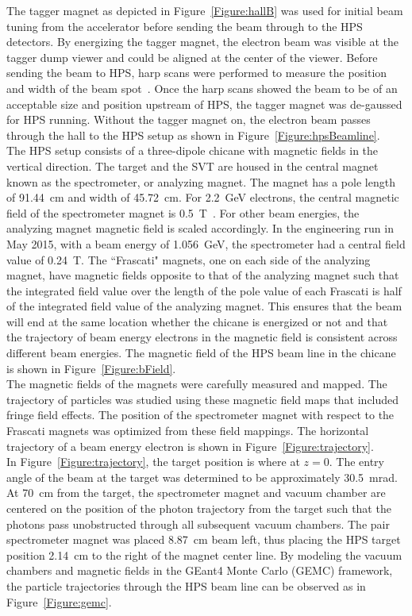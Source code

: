 The tagger magnet as depicted in Figure~\ref{Figure:hallB} was used for initial beam tuning from the accelerator before sending the beam through to the HPS detectors. By energizing the tagger magnet, the electron beam was visible at the tagger dump viewer and could be aligned at the center of the viewer. Before sending the beam to HPS, harp scans were performed to measure the position and width of the beam spot~\cite{beamline_nim_2017}. Once the harp scans showed the beam to be of an acceptable size and position upstream of HPS, the tagger magnet was de-gaussed for HPS running. Without the tagger magnet on, the electron beam passes through the hall to the HPS setup as shown in Figure~\ref{Figure:hpsBeamline}. \\
\indent The HPS setup consists of a three-dipole chicane with magnetic fields in the vertical direction. The target and the SVT are housed in the central magnet known as the spectrometer, or analyzing magnet. The magnet has a pole length of 91.44~cm and width of 45.72~cm. For 2.2~GeV electrons, the central magnetic field of the spectrometer magnet is 0.5~T~\cite{beamline_nim_2017}. For other beam energies, the analyzing magnet magnetic field is scaled accordingly. In the engineering run in May 2015, with a beam energy of 1.056~GeV, the spectrometer had a central field value of 0.24~T. The ``Frascati" magnets, one on each side of the analyzing magnet, have magnetic fields opposite to that of the analyzing magnet such that the integrated field value over the length of the pole value of each Frascati is half of the integrated field value of the analyzing magnet. This ensures that the beam will end at the same location whether the chicane is energized or not and that the trajectory of beam energy electrons in the magnetic field is consistent across different beam energies. The magnetic field of the HPS beam line in the chicane is shown in Figure~\ref{Figure:bField}.\\
\indent The magnetic fields of the magnets were carefully measured and mapped. The trajectory of particles was studied using these magnetic field maps that included fringe field effects. The position of the spectrometer magnet with respect to the Frascati magnets was optimized from these field mappings. The horizontal trajectory of a beam energy electron is shown in Figure~\ref{Figure:trajectory}.\\
\indent In Figure~\ref{Figure:trajectory}, the target position is where at $z=0$. The entry angle of the beam at the target was determined to be approximately 30.5~mrad. At 70~cm from the target, the spectrometer magnet and vacuum chamber are centered on the position of the photon trajectory from the target such that the photons pass unobstructed through all subsequent vacuum chambers. The pair spectrometer magnet was placed 8.87~cm beam left, thus placing the HPS target position 2.14~cm to the right of the magnet center line. By modeling the vacuum chambers and magnetic fields in the GEant4 Monte Carlo (GEMC) framework, the particle trajectories through the HPS beam line can be observed as in Figure~\ref{Figure:gemc}.\\
